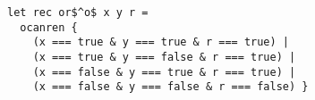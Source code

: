 \begin{lstlisting}
let rec or$^o$ x y r =
  ocanren {
    (x === true & y === true & r === true) |
    (x === true & y === false & r === true) |
    (x === false & y === true & r === true) |
    (x === false & y === false & r === false) }
\end{lstlisting}